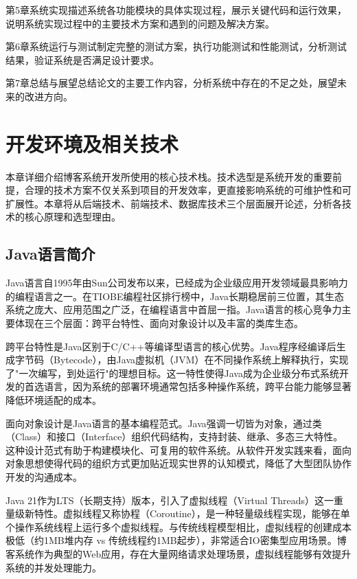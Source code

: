 \documentclass[UTF8,AutoFakeBold=1,AutoFakeSlant,zihao=-4]{SCAU}
\begin{document}
 第5章系统实现描述系统各功能模块的具体实现过程，展示关键代码和运行效果，说明系统实现过程中的主要技术方案和遇到的问题及解决方案。

 第6章系统运行与测试制定完整的测试方案，执行功能测试和性能测试，分析测试结果，验证系统是否满足设计要求。

 第7章总结与展望总结论文的主要工作内容，分析系统中存在的不足之处，展望未来的改进方向。

 \section{开发环境及相关技术}

 本章详细介绍博客系统开发所使用的核心技术栈。技术选型是系统开发的重要前提，合理的技术方案不仅关系到项目的开发效率，更直接影响系统的可维护性和可扩展性{\citep{罗涛2020}}。本章将从后端技术、前端技术、数据库技术三个层面展开论述，分析各技术的核心原理和选型理由。

 \subsection{Java语言简介}

 Java语言自1995年由Sun公司发布以来，已经成为企业级应用开发领域最具影响力的编程语言之一。在TIOBE编程社区排行榜中，Java长期稳居前三位置，其生态系统之庞大、应用范围之广泛，在编程语言中首屈一指。Java语言的核心竞争力主要体现在三个层面：跨平台特性、面向对象设计以及丰富的类库生态。

 跨平台特性是Java区别于C/C++等编译型语言的核心优势。Java程序经编译后生成字节码（Bytecode），由Java虚拟机（JVM）在不同操作系统上解释执行，实现了"一次编写，到处运行"的理想目标。这一特性使得Java成为企业级分布式系统开发的首选语言，因为系统的部署环境通常包括多种操作系统，跨平台能力能够显著降低环境适配的成本。

 面向对象设计是Java语言的基本编程范式。Java强调一切皆为对象，通过类（Class）和接口（Interface）组织代码结构，支持封装、继承、多态三大特性。这种设计范式有助于构建模块化、可复用的软件系统。从软件开发实践来看，面向对象思想使得代码的组织方式更加贴近现实世界的认知模式，降低了大型团队协作开发的沟通成本。

 Java 21作为LTS（长期支持）版本，引入了虚拟线程（Virtual Threads）这一重量级新特性。虚拟线程又称协程（Coroutine），是一种轻量级线程实现，能够在单个操作系统线程上运行多个虚拟线程。与传统线程模型相比，虚拟线程的创建成本极低（约1MB堆内存 vs 传统线程约1MB起步），非常适合IO密集型应用场景。博客系统作为典型的Web应用，存在大量网络请求处理场景，虚拟线程能够有效提升系统的并发处理能力。
\end{document}
